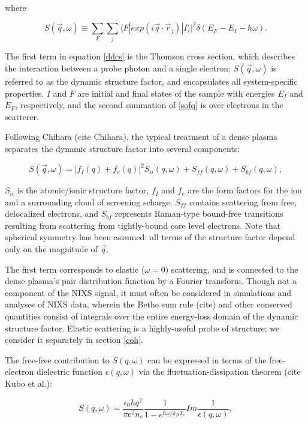 where 


\label{sofq}
\begin{equation}
S(\vec{q}, \omega) \equiv \sum_F  \sum_j\langle F|  exp(i \vec{q} \cdot \vec{r}_j) |I\rangle |^2 \delta(E_F - E_I - \hbar \omega).
\end{equation}

The first term in equation \ref{ddcs} is the Thomson cross section, which describes the interaction between a probe photon and a single electron; $S(\vec{q}, \omega)$ is referred to as the dynamic structure factor, and encapsulates all system-specific properties. $I$ and $F$ are initial and final states of the sample with energies $E_I$ and $E_F$, respectively, and the second summation of \ref{sofq} is over electrons in the scatterer.

Following Chihara (cite Chihara), the typical treatment of a dense plasma separates the dynamic structure factor into several components:

\begin{equation}
S(\vec{q}, \omega) = |f_I(q) + f_e(q)|^2 S_{ii}(q, \omega) + S_{ff}(q, \omega) + S_{bf}(q, \omega),
\end{equation}

$S_{ii}$ is the atomic/ionic structure factor, $f_I$ and $f_e$ are the form factors for the ion and a surrounding cloud of screening scharge. $S_{ff}$ contains scattering from free, delocalized electrons, and $S_{bf}$ represents Raman-type bound-free transitions resulting from scattering from tightly-bound core level electrons. Note that spherical symmetry has been assumed: all terms of the structure factor depend only on the magnitude of $\vec{q}$.

The first term corresponds to elastic ($\omega = 0$) scattering, and is connected to the dense plasma's pair distribution function by a Fourier transform. Though not a component of the NIXS signal, it must often be considered in simulations and analyses of NIXS data, wherein the Bethe sum rule (cite) and other conserved quantities consist of integrals over the entire energy-loss domain of the dynamic structure factor. Elastic scattering is a highly-useful probe of structure; we consider it separately in section \ref{coh}. 

The free-free contribution to $S(q, \omega)$ can be expressed in terms of the free-electron dielectric function $\epsilon(q, \omega)$  via the fluctuation-dissipation theorem (cite Kubo et al.):

\begin{equation}
S(q, \omega) = \frac{\epsilon_0 \hbar q^2}{\pi e^2 n_e} \frac{1}{1 - e^{\hbar \omega/k_B T_e}} Im\frac{1}{\epsilon(q, \omega)},
\end{equation}

